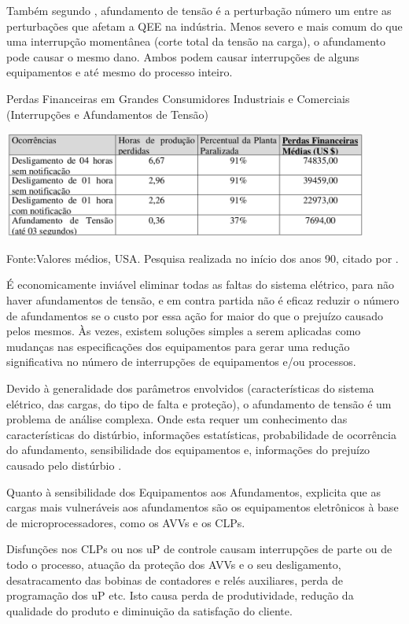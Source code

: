 \par
Também segundo \cite{ALV10}, afundamento de tensão é a perturbação número um entre as perturbações que afetam a QEE na indústria. Menos severo e mais comum do que uma interrupção momentânea (corte total da tensão na carga), o afundamento pode causar o mesmo dano. Ambos podem causar interrupções de alguns equipamentos e até mesmo do processo inteiro.
\begin{table}[!h]
\begin{center}
\caption{Perdas Financeiras em Grandes Consumidores Industriais e Comerciais (Interrupções e Afundamentos de Tensão)}
\includegraphics[width=12cm]{imagens/tab3_cap2.png}
\par{\small Fonte:Valores médios, USA. Pesquisa realizada no início dos anos 90, citado por \cite{ALV10}.}
\label{fig:tabperdas}
\end{center}
\end{table}
\par
É economicamente inviável eliminar todas as faltas do sistema elétrico, para não haver afundamentos de tensão, e em contra partida não é eficaz reduzir o número de afundamentos se o custo por essa ação for maior do que o prejuízo causado pelos mesmos.
Às vezes, existem soluções simples a serem aplicadas como mudanças nas especificações dos equipamentos para gerar uma redução significativa no número de interrupções de equipamentos e/ou processos.
\par
Devido à generalidade dos parâmetros envolvidos (características do sistema elétrico, das cargas, do tipo de falta e proteção), o afundamento de tensão é um problema de análise complexa. Onde esta requer um conhecimento das características do distúrbio, informações estatísticas, probabilidade de ocorrência do afundamento, sensibilidade dos equipamentos e, informações do prejuízo causado pelo distúrbio \cite{ALV10}.
\par
Quanto à sensibilidade dos Equipamentos aos Afundamentos, \cite{ALV10} explicita que as cargas mais vulneráveis aos afundamentos são os equipamentos eletrônicos à base de microprocessadores, como os \ac{AVVs} e os \ac{CLPs}.
\par
Disfunções nos \ac{CLPs} ou nos uP de controle causam interrupções de parte ou de todo o processo, atuação da proteção dos AVVs e o seu desligamento, desatracamento das bobinas de contadores e relés auxiliares, perda de programação dos uP etc. Isto causa perda de produtividade, redução da qualidade do produto e diminuição da satisfação do cliente.

